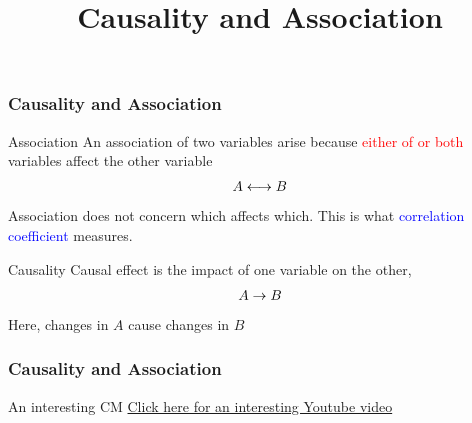 \documentclass[fleqn]{beamer}\usepackage[]{graphicx}\usepackage[]{color}
\begin{document}
\title{Causality and Association}
\author{}
\date{}

\begin{frame}
\maketitle
\end{frame}

\begin{frame}[t]
  \frametitle{Causality and Association}
  \begin{block}{Association}
    An association of two variables arise because \textcolor{red}{either of or both} variables affect the other variable
    \begin{align}
     A \longleftrightarrow B \notag
    \end{align}
    Association does not concern which affects which. This is what \textcolor{blue}{correlation coefficient} measures.
  \end{block}

  \begin{block}{Causality}
    Causal effect is the impact of one variable on the other,
    \begin{align}
     A \rightarrow B \notag
    \end{align}
    Here, changes in $A$ cause changes in $B$
  \end{block}
\end{frame}

\begin{frame}[c]
  \frametitle{Causality and Association}
  \begin{block}{An interesting CM}
    \href{https://www.youtube.com/watch?v=KSHMgoUWBmY}{Click here for an interesting Youtube video}
  \end{block}

\end{frame}
\end{document}
